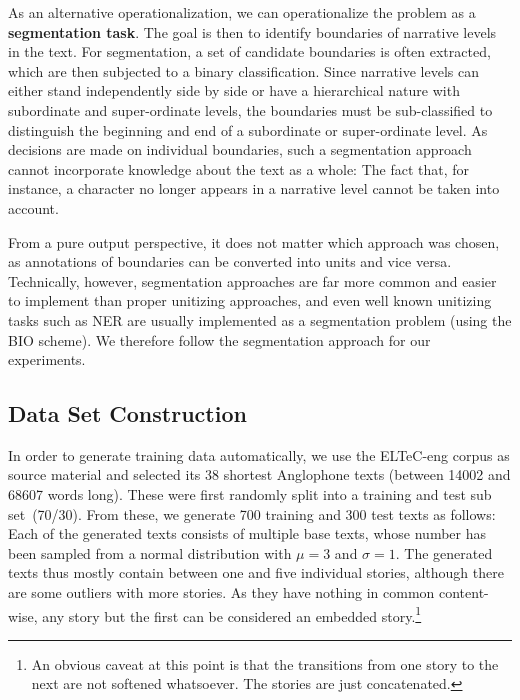 \documentclass[10pt, a4paper]{article}
\newcommand{\sina}[1]{\textit{\textcolor{blue}{sina: #1}}}
\begin{document}
As an alternative operationalization, we can operationalize the problem as a \textbf{segmentation task}. The goal is then to identify boundaries of narrative levels in the text. For segmentation, a set of candidate boundaries is often extracted, which are then subjected to a binary classification. 
Since narrative levels can either stand independently side by side or have a hierarchical nature with subordinate and super-ordinate levels, the boundaries must be sub-classified to distinguish the beginning and end of a subordinate or super-ordinate level.
As decisions are made on individual boundaries, such a segmentation approach cannot incorporate knowledge about the text as a whole: The fact that, for instance, a character no longer appears in a narrative level cannot be taken into account.

From a pure output perspective, it does not matter which approach was chosen, as annotations of boundaries can be converted into units and vice versa. Technically, however, segmentation approaches are far more common and easier to implement than proper unitizing approaches, and even well known unitizing tasks such as NER are usually implemented as a segmentation problem (using the BIO scheme). We therefore follow the segmentation approach for our experiments.

\subsection{Data Set Construction}
\label{sec:data-set}


In order to generate training data automatically, we use the ELTeC-eng \cite{eltec} corpus as source material and selected its 38 shortest Anglophone texts (between \num{14002} and \num{68607} words long). These were first randomly split into a training and test sub set~(70/30). From these, we generate 700 training and 300 test texts as follows: Each of the generated texts consists of multiple base texts, whose number has been sampled from a normal distribution with $\mu=3$ and $\sigma=1$. The generated texts thus mostly contain between one and five individual stories, although there are some outliers with more stories. As they have nothing in common content-wise, any story but the first can be considered an embedded story.\footnote{An obvious caveat at this point is that the transitions from one story to the next are not softened whatsoever. The stories are just concatenated.}
\end{document}

